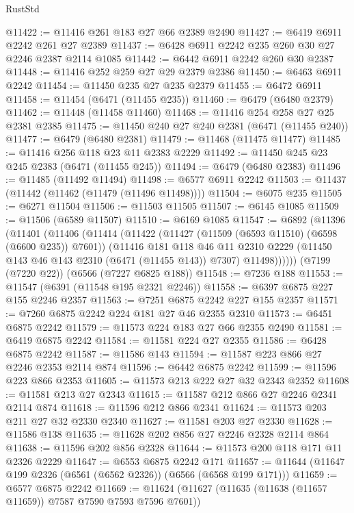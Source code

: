 \begin{lexlean}{RustStd}
\begin{coremodule}
{\begin{coremodule}
{{{{{{{{{{{{{{{{{{{{{{{{{{@11422 := @11416 @261 @183 @27 @66 @2389 @2490
@11427 := @6419 @6911 @2242 @261 @27 @2389
@11437 := @6428 @6911 @2242 @235 @260 @30 @27 @2246 @2387 @2114 @1085
@11442 := @6442 @6911 @2242 @260 @30 @2387
@11448 := @11416 @252 @259 @27 @29 @2379 @2386
@11450 := @6463 @6911 @2242
@11454 := @11450 @235 @27 @235 @2379
@11455 := @6472 @6911
@11458 := @11454 (@6471 (@11455 @235))
@11460 := @6479 (@6480 @2379)
@11462 := @11448 (@11458 @11460)
@11468 := @11416 @254 @258 @27 @25 @2381 @2385
@11475 := @11450 @240 @27 @240 @2381 (@6471 (@11455 @240))
@11477 := @6479 (@6480 @2381)
@11479 := @11468 (@11475 @11477)
@11485 := @11416 @256 @118 @23 @11 @2383 @2229
@11492 := @11450 @245 @23 @245 @2383 (@6471 (@11455 @245))
@11494 := @6479 (@6480 @2383)
@11496 := @11485 (@11492 @11494)
@11498 := @6577 @6911 @2242
@11503 := @11437 (@11442 (@11462 (@11479 (@11496 @11498))))
@11504 := @6075 @235
@11505 := @6271 @11504
@11506 := @11503 @11505
@11507 := @6145 @1085
@11509 := @11506 (@6589 @11507)
@11510 := @6169 @1085
@11547 := @6892
    (@11396
      (@11401
        (@11406
          (@11414
            (@11422
              (@11427 (@11509 (@6593 @11510) (@6598 (@6600 @235)) @7601))
              (@11416
                @181
                @118
                @46
                @11
                @2310
                @2229
                (@11450 @143 @46 @143 @2310 (@6471 (@11455 @143)) @7307)
                @11498))))))
    (@7199 (@7220 @22))
    (@6566 (@7227 @6825 @188))
@11548 := @7236 @188
@11553 := @11547 (@6391 (@11548 @195 @2321 @2246))
@11558 := @6397 @6875 @227 @155 @2246 @2357
@11563 := @7251 @6875 @2242 @227 @155 @2357
@11571 := @7260 @6875 @2242 @224 @181 @27 @46 @2355 @2310
@11573 := @6451 @6875 @2242
@11579 := @11573 @224 @183 @27 @66 @2355 @2490
@11581 := @6419 @6875 @2242
@11584 := @11581 @224 @27 @2355
@11586 := @6428 @6875 @2242
@11587 := @11586 @143
@11594 := @11587 @223 @866 @27 @2246 @2353 @2114 @874
@11596 := @6442 @6875 @2242
@11599 := @11596 @223 @866 @2353
@11605 := @11573 @213 @222 @27 @32 @2343 @2352
@11608 := @11581 @213 @27 @2343
@11615 := @11587 @212 @866 @27 @2246 @2341 @2114 @874
@11618 := @11596 @212 @866 @2341
@11624 := @11573 @203 @211 @27 @32 @2330 @2340
@11627 := @11581 @203 @27 @2330
@11628 := @11586 @138
@11635 := @11628 @202 @856 @27 @2246 @2328 @2114 @864
@11638 := @11596 @202 @856 @2328
@11644 := @11573 @200 @118 @171 @11 @2326 @2229
@11647 := @6553 @6875 @2242 @171
@11657 := @11644 (@11647 @199 @2326 (@6561 (@6562 @2326)) (@6566 (@6568 @199 @171)))
@11659 := @6577 @6875 @2242
@11669 := @11624 (@11627 (@11635 (@11638 (@11657 @11659)) @7587 @7590 @7593 @7596 @7601))
}}}}}}}}}}}}}}}}}}}}}}}}}}
\end{coremodule}}
\end{coremodule}
\end{lexlean}
